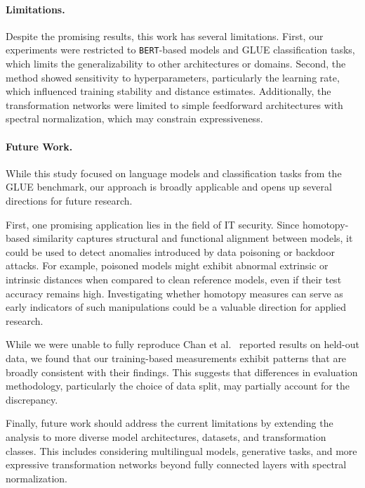 \paragraph{Limitations.}
Despite the promising results, this work has several limitations. 
First, our experiments were restricted to \texttt{BERT}-based models and \ac{GLUE} classification tasks, which limits the generalizability to other architectures or domains. 
Second, the method showed sensitivity to hyperparameters, particularly the learning rate, which influenced training stability and distance estimates. 
Additionally, the transformation networks were limited to simple feedforward architectures with spectral normalization, which may constrain expressiveness.

\paragraph{Future Work.}
While this study focused on language models and classification tasks from the \ac{GLUE} benchmark, our approach is broadly applicable and opens up several directions for future research.

First, one promising application lies in the field of IT security.
Since homotopy-based similarity captures structural and functional alignment between models, it could be used to detect anomalies introduced by data poisoning or backdoor attacks.
For example, poisoned models might exhibit abnormal extrinsic or intrinsic distances when compared to clean reference models, even if their test accuracy remains high.
Investigating whether homotopy measures can serve as early indicators of such manipulations could be a valuable direction for applied research.

 
While we were unable to fully reproduce Chan et al.~\cite{chan_affine_2024} reported results on held-out data, we found that our training-based measurements exhibit patterns that are broadly consistent with their findings.  
This suggests that differences in evaluation methodology, particularly the choice of data split, may partially account for the discrepancy.




Finally, future work should address the current limitations by extending the analysis to more diverse model architectures, datasets, and transformation classes.
This includes considering multilingual models, generative tasks, and more expressive transformation networks beyond fully connected layers with spectral normalization.